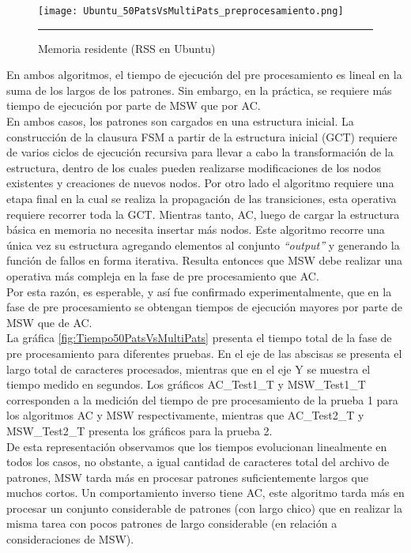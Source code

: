 {\begin{figure}[H]
	\centering
		\texttt{[image: Ubuntu\_50PatsVsMultiPats\_preprocesamiento.png]}
		\rule{35em}{0.5pt}
	\caption[gráfica RSS]{Memoria residente (RSS en Ubuntu)}
	\label{fig:Memoria50PatsVsMultiPats}
\end{figure}
En ambos algoritmos, el tiempo de ejecución del pre procesamiento es lineal en la suma de los largos de los patrones. Sin embargo, en la práctica, se requiere más tiempo de ejecución por parte de MSW que por AC. \\
En ambos casos, los patrones son cargados en una estructura inicial.
La construcción de la clausura FSM a partir de la estructura inicial (GCT) requiere de varios ciclos de ejecución recursiva para llevar a cabo la transformación de la estructura, dentro de los cuales pueden realizarse modificaciones de los nodos existentes y creaciones de nuevos nodos. Por otro lado el algoritmo requiere una etapa final en la cual se realiza la propagación de las transiciones, esta operativa requiere recorrer toda la GCT. Mientras tanto, AC, luego de cargar la estructura básica en memoria no necesita insertar más nodos. Este algoritmo recorre una única vez su estructura agregando elementos al conjunto {\it “output”} y generando la función de fallos en forma iterativa.
Resulta entonces que MSW debe realizar una operativa más compleja en la fase de pre procesamiento que AC.\\
Por esta razón, es esperable, y así fue confirmado experimentalmente, que en la fase de pre procesamiento se obtengan tiempos de ejecución mayores por parte de MSW que de AC.\\
La gráfica \ref{fig:Tiempo50PatsVsMultiPats} presenta el tiempo total de la fase de pre procesamiento para diferentes pruebas. En el eje de las abscisas se presenta el largo total de caracteres procesados, mientras que en el eje Y se muestra el tiempo medido en segundos. Los gráficos AC\_Test1\_T y MSW\_Test1\_T corresponden a la medición del tiempo de pre procesamiento de la prueba 1 para los algoritmos AC y MSW respectivamente, mientras que AC\_Test2\_T y MSW\_Test2\_T presenta los gráficos para la prueba 2.\\
De esta representación observamos que los tiempos evolucionan linealmente en todos los casos, no obstante, a igual cantidad de caracteres total del archivo de patrones, MSW tarda más en procesar patrones suficientemente largos que muchos cortos. Un comportamiento inverso tiene AC, este algoritmo tarda más en procesar un conjunto considerable de patrones (con largo chico) que en realizar la misma tarea con pocos patrones de largo considerable (en relación a consideraciones de MSW).\\
}

